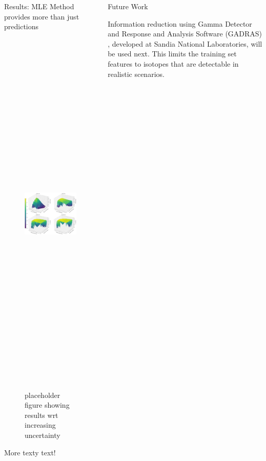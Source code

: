 \documentclass{beamer}
\begin{document}
\begin{frame}[t]{}
\begin{columns}
\begin{column}[T]{0.72\textwidth}
\begin{columns}[t]
\begin{column}{0.6\textwidth}
\begin{block}{Results: MLE Method provides more than just predictions}
\begin{figure}
\begin{minipage}{.5\textwidth}
  \includegraphics[height=18cm]{figures/placeholder_unc.png}
  \caption{placeholder figure showing results wrt increasing uncertainty}
\end{minipage}
\end{figure}

More texty text!

\end{block}
\end{column}

\begin{column}{0.4\textwidth}

\begin{block}{Future Work}

Information reduction using Gamma Detector and Response and Analysis Software
(GADRAS) \cite{gadras}, developed at Sandia National Laboratories, will be used
next. This limits the training set features to isotopes that are detectable
in realistic scenarios. \\~\\


\end{block}
\end{column}
\end{columns}
\end{column}
\end{columns}
\end{frame}
\end{document}
